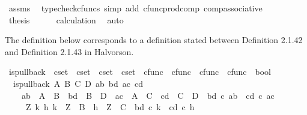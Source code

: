 \begin{isabellebody}
\ assms\ \isamarkupfalse%
\ {\isacharparenleft}{\kern0pt}typecheck{\isacharunderscore}{\kern0pt}cfuncs{\isacharcomma}{\kern0pt}\ simp\ add{\isacharcolon}{\kern0pt}\ cfunc{\isacharunderscore}{\kern0pt}prod{\isacharunderscore}{\kern0pt}comp\ comp{\isacharunderscore}{\kern0pt}associative{}{\isacharparenright}{\kern0pt}\isanewline
\ \ \isamarkupfalse%
\ \isamarkupfalse%
\ {\isacharquery}{\kern0pt}thesis\isanewline
\ \ \ \ \isamarkupfalse%
\ calculation\ \isamarkupfalse%
\ auto\isanewline
{}\isamarkupfalse%
%
\endisatagproof
{\isafoldproof}%
%
\isadelimproof
%
\endisadelimproof
%
\isadelimdocument
%
\endisadelimdocument
%
\isatagdocument
%
\isamarkuptrue%
%
\endisatagdocument
{\isafolddocument}%
%
\isadelimdocument
%
\endisadelimdocument
%
\begin{isamarkuptext}%
The definition below corresponds to a definition stated between Definition 2.1.42 and Definition 2.1.43 in Halvorson.%
\end{isamarkuptext}\isamarkuptrue%
\isamarkupfalse%
\ is{\isacharunderscore}{\kern0pt}pullback\ {\isacharcolon}{\kern0pt}{\isacharcolon}{\kern0pt}\ {\isachardoublequoteopen}cset\ {\isasymRightarrow}\ cset\ {\isasymRightarrow}\ cset\ {\isasymRightarrow}\ cset\ {\isasymRightarrow}\ cfunc\ {\isasymRightarrow}\ cfunc\ {\isasymRightarrow}\ cfunc\ {\isasymRightarrow}\ cfunc\ {\isasymRightarrow}\ bool{\isachardoublequoteclose}\ \isanewline
\ \ {\isachardoublequoteopen}is{\isacharunderscore}{\kern0pt}pullback\ A\ B\ C\ D\ ab\ bd\ ac\ cd\ {\isasymlongleftrightarrow}\ \isanewline
\ \ \ \ {\isacharparenleft}{\kern0pt}ab\ {\isacharcolon}{\kern0pt}\ A\ {\isasymrightarrow}\ B\ {\isasymand}\ bd\ {\isacharcolon}{\kern0pt}\ B\ {\isasymrightarrow}\ D\ {\isasymand}\ ac\ {\isacharcolon}{\kern0pt}\ A\ {\isasymrightarrow}\ C\ {\isasymand}\ cd\ {\isacharcolon}{\kern0pt}\ C\ {\isasymrightarrow}\ D\ {\isasymand}\ bd\ {\isasymcirc}\isactrlsub c\ ab\ {\isacharequal}{\kern0pt}\ cd\ {\isasymcirc}\isactrlsub c\ ac\ {\isasymand}\ \isanewline
\ \ \ \ {\isacharparenleft}{\kern0pt}{\isasymforall}\ Z\ k\ h{\isachardot}{\kern0pt}\ {\isacharparenleft}{\kern0pt}k\ {\isacharcolon}{\kern0pt}\ Z\ {\isasymrightarrow}\ B\ {\isasymand}\ h\ {\isacharcolon}{\kern0pt}\ Z\ {\isasymrightarrow}\ C\ {\isasymand}\ bd\ {\isasymcirc}\isactrlsub c\ k\ {\isacharequal}{\kern0pt}\ cd\ {\isasymcirc}\isactrlsub c\ h{\isacharparenright}{\kern0pt}\ \ {\isasymlongrightarrow}\isanewline

\end{isabellebody}
